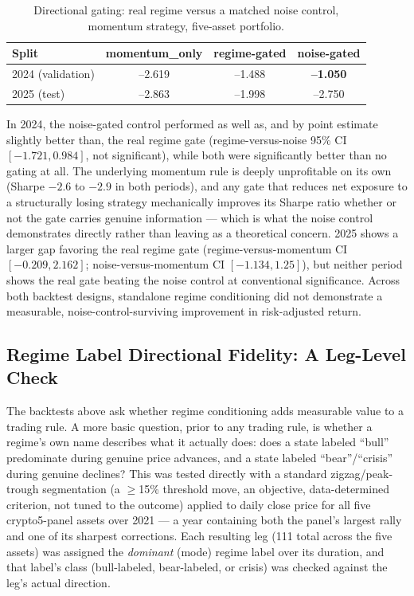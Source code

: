 \begin{table}[H]
\centering
\small
\caption{Directional gating: real regime versus a matched noise control, momentum strategy, five-asset portfolio.}
\label{tab:regime-directional-backtest}
\begin{tabular}{|l|c|c|c|}
\hline
\textbf{Split} & \textbf{momentum\_only} & \textbf{regime-gated} & \textbf{noise-gated} \\
\hline
2024 (validation) & --2.619 & --1.488 & \textbf{--1.050} \\
\hline
2025 (test) & --2.863 & --1.998 & --2.750 \\
\hline
\end{tabular}
\normalsize
\end{table}

In 2024, the noise-gated control performed as well as, and by point estimate slightly better than, the real regime gate (regime-versus-noise 95\% CI $[-1.721, 0.984]$, not significant), while both were significantly better than no gating at all. The underlying momentum rule is deeply unprofitable on its own (Sharpe $-2.6$ to $-2.9$ in both periods), and any gate that reduces net exposure to a structurally losing strategy mechanically improves its Sharpe ratio whether or not the gate carries genuine information --- which is what the noise control demonstrates directly rather than leaving as a theoretical concern. 2025 shows a larger gap favoring the real regime gate (regime-versus-momentum CI $[-0.209, 2.162]$; noise-versus-momentum CI $[-1.134, 1.25]$), but neither period shows the real gate beating the noise control at conventional significance. Across both backtest designs, standalone regime conditioning did not demonstrate a measurable, noise-control-surviving improvement in risk-adjusted return.

\subsection{Regime Label Directional Fidelity: A Leg-Level Check}
\label{subsec:regime-zigzag}

The backtests above ask whether regime conditioning adds measurable value to a trading rule. A more basic question, prior to any trading rule, is whether a regime's own name describes what it actually does: does a state labeled ``bull'' predominate during genuine price advances, and a state labeled ``bear''/``crisis'' during genuine declines? This was tested directly with a standard zigzag/peak-trough segmentation (a $\geq$15\% threshold move, an objective, data-determined criterion, not tuned to the outcome) applied to daily close price for all five crypto5-panel assets over 2021 --- a year containing both the panel's largest rally and one of its sharpest corrections. Each resulting leg (111 total across the five assets) was assigned the \emph{dominant} (mode) regime label over its duration, and that label's class (bull-labeled, bear-labeled, or crisis) was checked against the leg's actual direction.

